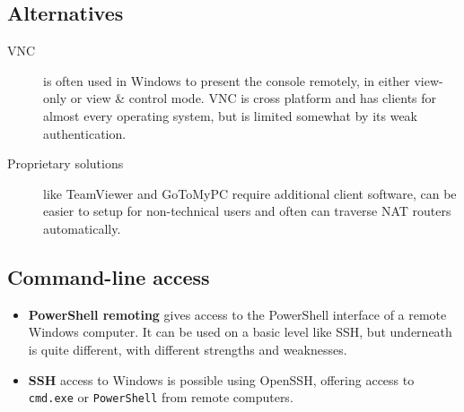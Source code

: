 \subsection{Alternatives}\label{alternatives}

\begin{description}
\item[VNC]
is often used in Windows to present the console remotely, in either
view-only or view \& control mode. VNC is cross platform and has clients
for almost every operating system, but is limited somewhat by its weak
authentication.
\item[Proprietary solutions]
like TeamViewer and GoToMyPC require additional client software, can be
easier to setup for non-technical users and often can traverse NAT
routers automatically.
\end{description}

\subsection{Command-line access}\label{command-line-access}

\begin{itemize}
\item
  \textbf{PowerShell remoting} gives access to the PowerShell interface
  of a remote Windows computer. It can be used on a basic level like
  SSH, but underneath is quite different, with different strengths and
  weaknesses.
\item
  \textbf{SSH} access to Windows is possible using OpenSSH, offering
  access to \texttt{cmd.exe} or \texttt{PowerShell} from remote
  computers.
\end{itemize}





